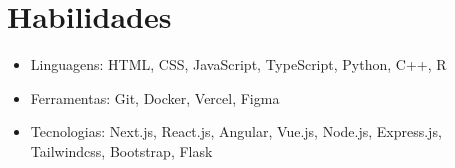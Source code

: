 \section{Habilidades}
    \resumeSubHeadingListStart

        
        \begin{itemize}[leftmargin=0.4in]
            \itemsep-0.4em 
            
        	\item{\small{Linguagens: HTML, CSS, JavaScript, TypeScript, Python, C++, R}}
            \item{\small{Ferramentas: Git, Docker, Vercel, Figma}}
            \item{\small{Tecnologias: Next.js, React.js, Angular, Vue.js, Node.js, Express.js, Tailwindcss, Bootstrap, Flask} }
            
        \end{itemize}
        
        

    
    \resumeSubHeadingListEnd
    
